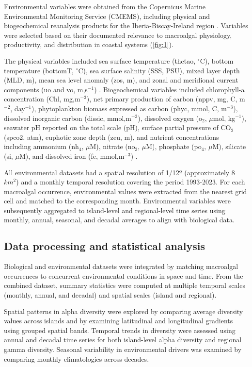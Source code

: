 \documentclass[a4paper,fleqn]{cas-sc}
\begin{document}
Environmental variables were obtained from the Copernicus Marine Environmental Monitoring Service (CMEMS), including physical and biogeochemical reanalysis products for the Iberia-Biscay-Ireland region \citep{CMEMS_BGC_IBI2024_Aznar2016, CMEMS_PHY_IBI2024, CMEMS_BGC_IBI2024}. Variables were selected based on their documented relevance to macroalgal physiology, productivity, and distribution in coastal systems (\ref{fig:1}). 

The physical variables included sea surface temperature (thetao, $^\circ$C), bottom temperature (bottomT, $^\circ$C), sea surface salinity (SSS, PSU), mixed layer depth (MLD, m), mean sea level anomaly (zos, m), and zonal and meridional current components (uo and vo, m,s$^{-1}$) \citep{CMEMS_PHY_IBI2024}.
Biogeochemical variables included chlorophyll-a concentration (Chl, mg,m$^{-3}$), net primary production of carbon (nppv, mg, C, m$^{-2}$, day$^{-1}$), phytoplankton biomass expressed as carbon (phyc, mmol, C, m$^{-3}$), dissolved inorganic carbon (dissic, mmol,m$^{-3}$), dissolved oxygen (o$_2$, $\mu$mol, kg$^{-1}$), seawater pH reported on the total scale (pH), surface partial pressure of CO$_2$ (spco2, atm), euphotic zone depth (zeu, m), and nutrient concentrations including ammonium (nh$_4$, $\mu$M), nitrate (no$_3$, $\mu$M), phosphate (po$_4$, $\mu$M), silicate (si, $\mu$M), and dissolved iron (fe, mmol,m$^{-3}$) \citep{CMEMS_BGC_IBI2024}.

All environmental datasets had a spatial resolution of 1/12º (approximately 8 $km^{2}$) and a monthly temporal resolution covering the period 1993-2023. For each macroalgal occurrence, environmental values were extracted from the nearest grid cell and matched to the corresponding month. Environmental variables were subsequently aggregated to island-level and regional-level time series using monthly, annual, seasonal, and decadal averages to align with biological data.

\subsection{Data processing and statistical analysis}

Biological and environmental datasets were integrated by matching macroalgal occurrences to concurrent environmental conditions in space and time. From the combined dataset, summary statistics were computed at multiple temporal scales (monthly, annual, and decadal) and spatial scales (island and regional).

Spatial patterns in alpha diversity were explored by comparing average diversity values across islands and by examining latitudinal and longitudinal gradients using grouped spatial bands. Temporal trends in diversity were assessed using annual and decadal time series for both island-level alpha diversity and regional gamma diversity. Seasonal variability in environmental drivers was examined by comparing monthly climatologies across decades.
\end{document}
